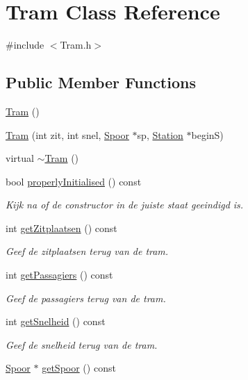 \hypertarget{class_tram}{}\section{Tram Class Reference}
\label{class_tram}


{\ttfamily \#include $<$Tram.\+h$>$}

\subsection*{Public Member Functions}
\begin{DoxyCompactItemize}
\item 
\hyperlink{class_tram_aad83b2e7e79d57528691bf317ab0e1ef}{Tram} ()
\item 
\hyperlink{class_tram_a0a092211c8c234c6372318a622810d2c}{Tram} (int zit, int snel, \hyperlink{class_spoor}{Spoor} $\ast$sp, \hyperlink{class_station}{Station} $\ast$beginS)
\item 
virtual \hyperlink{class_tram_acd6056d2289f2dccd371bc226cd2cb17}{$\sim$\+Tram} ()
\item 
bool \hyperlink{class_tram_ac2688f590e4db232b4f535c9bf959efb}{properly\+Initialised} () const
\begin{DoxyCompactList}\small\item\em Kijk na of de constructor in de juiste staat geeindigd is. \end{DoxyCompactList}\item 
int \hyperlink{class_tram_abcb1ce0d10e394fce8a99b460e5104de}{get\+Zitplaatsen} () const
\begin{DoxyCompactList}\small\item\em Geef de zitplaatsen terug van de tram. \end{DoxyCompactList}\item 
int \hyperlink{class_tram_a678ba2cd0c6ab76e966947944f599d56}{get\+Passagiers} () const
\begin{DoxyCompactList}\small\item\em Geef de passagiers terug van de tram. \end{DoxyCompactList}\item 
int \hyperlink{class_tram_aa8bcd980469801cb8524f170006f666c}{get\+Snelheid} () const
\begin{DoxyCompactList}\small\item\em Geef de snelheid terug van de tram. \end{DoxyCompactList}\item 
\hyperlink{class_spoor}{Spoor} $\ast$ \hyperlink{class_tram_aee9cf13e0525ac7c769709edf1ff987d}{get\+Spoor} () const

\end{DoxyCompactItemize}
